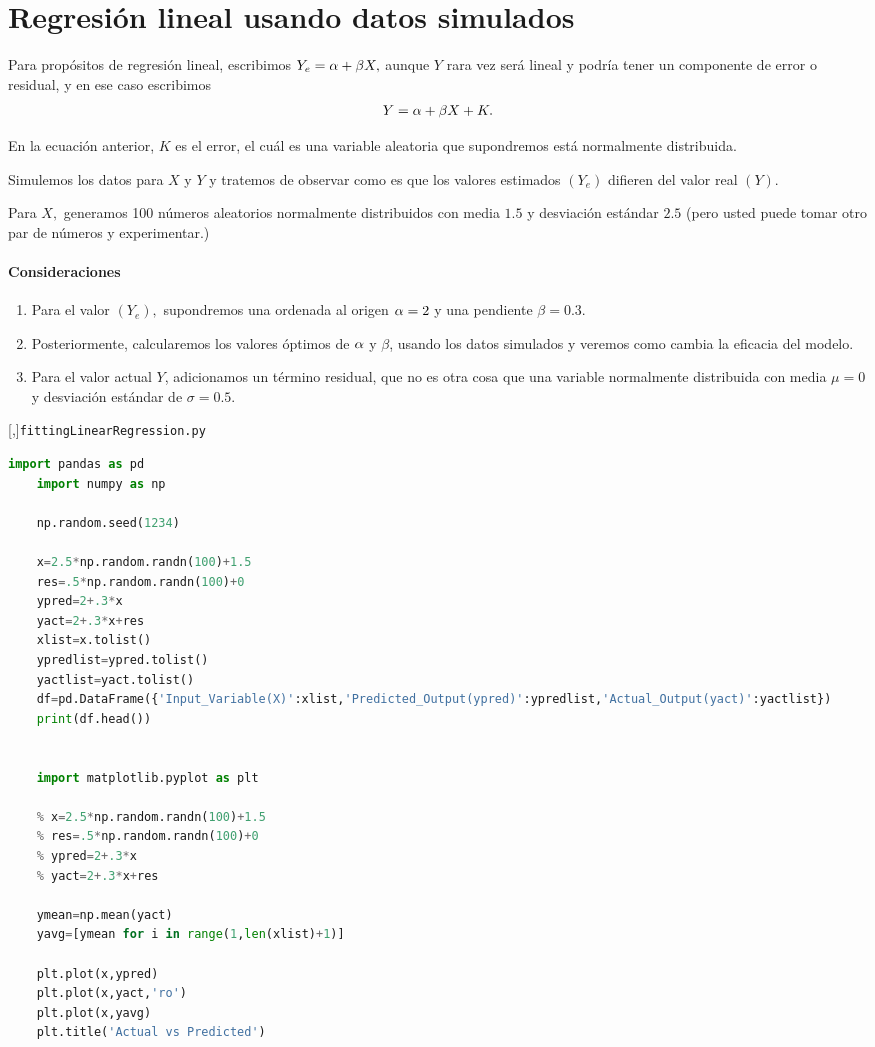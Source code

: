 \section{Regresión lineal usando datos simulados}

Para propósitos de regresión lineal, escribimos $Y_{e}=\alpha+\beta X,$ aunque $Y$ rara vez será lineal y podría tener un componente de error o residual, y en ese caso escribimos
\begin{align}
	Y=\alpha + \beta X + K.
\end{align}


En la ecuación anterior, $K$ es el error, el cuál es una variable aleatoria que supondremos está normalmente distribuida.


Simulemos los datos para $X$ y $Y$ y tratemos de observar como es que los valores estimados $\left( Y_{e} \right)$ difieren del valor real $\left( Y \right)$.


Para $X,$ generamos 100 números aleatorios normalmente distribuidos con media $1.5$ y desviación estándar $2.5$ (pero usted puede tomar otro par de números y experimentar.)


\paragraph{Consideraciones}
\begin{enumerate}
	\item Para el valor $(Y_{e}),$ supondremos una ordenada al origen $\alpha=2$ y una pendiente $\beta=0.3$. 
	
	\item
	Posteriormente, calcularemos los valores óptimos de $\alpha$ y $\beta$, usando los datos simulados y veremos como cambia la eficacia del modelo.
	
	\item
	Para el valor actual $Y$, adicionamos un término residual, que no es otra cosa que una variable normalmente distribuida con media $\mu=0$ y desviación estándar de $\sigma=0.5$.
\end{enumerate}


[,]{\texttt{fittingLinearRegression.py}}
\begin{lstlisting}[language=Python]
	import pandas as pd
	import numpy as np
	
	np.random.seed(1234)
	
	x=2.5*np.random.randn(100)+1.5
	res=.5*np.random.randn(100)+0
	ypred=2+.3*x
	yact=2+.3*x+res
	xlist=x.tolist()
	ypredlist=ypred.tolist()
	yactlist=yact.tolist()
	df=pd.DataFrame({'Input_Variable(X)':xlist,'Predicted_Output(ypred)':ypredlist,'Actual_Output(yact)':yactlist})
	print(df.head())
	
	
	import matplotlib.pyplot as plt
	
	% x=2.5*np.random.randn(100)+1.5
	% res=.5*np.random.randn(100)+0
	% ypred=2+.3*x
	% yact=2+.3*x+res
	
	ymean=np.mean(yact)
	yavg=[ymean for i in range(1,len(xlist)+1)]
	
	plt.plot(x,ypred)
	plt.plot(x,yact,'ro')
	plt.plot(x,yavg)
	plt.title('Actual vs Predicted')
\end{lstlisting}

